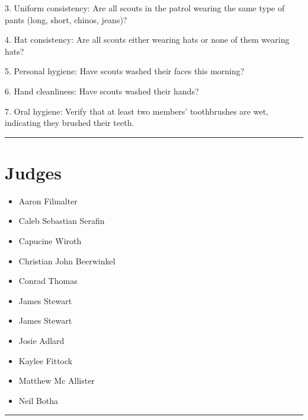 \documentclass[10pt]{article}
\begin{document}
3. Uniform consistency: Are all scouts in the patrol wearing the same type of pants (long, short, chinos, jeans)?

4. Hat consistency: Are all scouts either wearing hats or none of them wearing hats?

5. Personal hygiene: Have scouts washed their faces this morning?

6. Hand cleanliness: Have scouts washed their hands?

7. Oral hygiene: Verify that at least two members' toothbrushes are wet, indicating they brushed their teeth.
\vspace{0.5cm}
	\hrule
	\vspace{0.5cm}
		\section*{\faUsers \: Judges}

		

	\begin{multicols}{2}

		\begin{itemize}
									\item Aaron Filmalter
									\item Caleb Sebastian Serafin
									\item Capucine Wiroth
									\item Christian John Beerwinkel
									\item Conrad Thomas
									\item James Stewart
						\end{itemize}

		\vfill\null
		\columnbreak

		\begin{itemize}
									\item James Stewart
									\item Josie Adlard
									\item Kaylee Fittock
									\item Matthew Mc Allister
									\item Neil Botha
						\end{itemize}

		\vfill\null

		\end{multicols}



			\vspace{0.5cm}
	\hrule
	\vspace{0.5cm}
\end{document}

